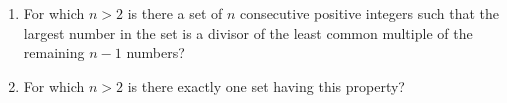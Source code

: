 \begin{enumerate}[label = (\alph*)]
	\item For which $n>2$ is there a set of $n$ consecutive positive integers such that the largest number in the set is a divisor of the least common multiple of the remaining $n-1$ numbers?
	\item For which $n>2$ is there exactly one set having this property?
\end{enumerate}
